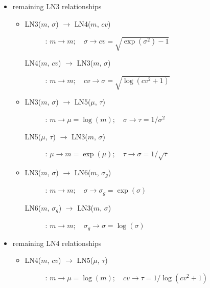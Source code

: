 {\begin{itemize}
\begin{itemize}
\item 
\begin{description}
\item[LN2($\mu$, $v$) $\rightarrow$ LN6($m$, $\sigma_g$)]:
$\mu \rightarrow m=\exp(\mu); \quad v \rightarrow \sigma_g=\exp(\sqrt{v})$

\item[LN6($m$, $\sigma_g$) $\rightarrow$ LN2($\mu$, $v$)]:
$m \rightarrow \mu=\log(m); \quad \sigma_g \rightarrow v=\log(\sigma_g^2)$
\end{description}
\end{itemize}

\item 
remaining LN3 relationships
\begin{itemize}
\item 
\begin{description}
\item[LN3($m$, $\sigma$) $\rightarrow$ LN4($m$, $cv$)]:
$m \rightarrow m; \quad \sigma \rightarrow cv=\sqrt{\exp(\sigma^2)-1}$

\item[LN4($m$, $cv$) $\rightarrow$ LN3($m$, $\sigma$)]:
$m \rightarrow m; \quad cv \rightarrow \sigma=\sqrt{\log(cv^2 + 1)}$
\end{description}

\item 
\begin{description}
\item[LN3($m$, $\sigma$) $\rightarrow$ LN5($\mu$, $\tau$)]:
$m \rightarrow \mu=\log(m); \quad \sigma \rightarrow \tau=1/\sigma^2$

\item[LN5($\mu$, $\tau$) $\rightarrow$ LN3($m$, $\sigma$)]:
$\mu \rightarrow m=\exp(\mu); \quad \tau \rightarrow \sigma=1/\sqrt{\tau}$
\end{description}

\item 
\begin{description}
\item[LN3($m$, $\sigma$) $\rightarrow$ LN6($m$, $\sigma_g$)]:
$m \rightarrow m; \quad \sigma \rightarrow \sigma_g=\exp(\sigma)$

\item[LN6($m$, $\sigma_g$) $\rightarrow$ LN3($m$, $\sigma$)]:
$m \rightarrow m; \quad \sigma_g \rightarrow \sigma=\log(\sigma)$
\end{description}
\end{itemize}

\item 
remaining LN4 relationships
\begin{itemize}
\item 
\begin{description}
\item[LN4($m$, $cv$) $\rightarrow$ LN5($\mu$, $\tau$)]:
$m \rightarrow \mu=\log(m); \quad cv \rightarrow \tau=1/\log(cv^2+1)$


\end{description}
\end{itemize}
\end{itemize}}
